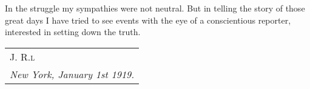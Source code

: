 In the struggle my sympathies were not neutral. But in telling the story of those great days I have tried to see events with the eye of a conscientious reporter, interested in setting down the truth.

\hfill
\begin{tabular}{@{}l@{}}
\scshape J. R.l\\
\emph{New York, January 1st 1919.}
\end{tabular}

